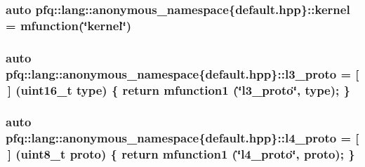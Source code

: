 \hypertarget{namespacepfq_1_1lang_1_1anonymous__namespace_02default_8hpp_03_a93294225145f96c6aa6cf0cedfa19103}{
\subsubsection[{kernel}]{\setlength{\rightskip}{0pt plus 5cm}auto pfq\+::lang\+::anonymous\+\_\+namespace\{default.\+hpp\}\+::kernel = {\bf mfunction}(\char`\"{}kernel\char`\"{})}}\label{namespacepfq_1_1lang_1_1anonymous__namespace_02default_8hpp_03_a93294225145f96c6aa6cf0cedfa19103}
\hypertarget{namespacepfq_1_1lang_1_1anonymous__namespace_02default_8hpp_03_a1515f230673119530cd04f213627976f}{
\subsubsection[{l3\+\_\+proto}]{\setlength{\rightskip}{0pt plus 5cm}auto pfq\+::lang\+::anonymous\+\_\+namespace\{default.\+hpp\}\+::l3\+\_\+proto = \mbox{[}$\,$\mbox{]} (uint16\+\_\+t type) \{ return {\bf mfunction1} (\char`\"{}l3\+\_\+proto\char`\"{}, type); \}}}\label{namespacepfq_1_1lang_1_1anonymous__namespace_02default_8hpp_03_a1515f230673119530cd04f213627976f}
\hypertarget{namespacepfq_1_1lang_1_1anonymous__namespace_02default_8hpp_03_a8ad2208c91dc3cd4378e715aab5fb4b7}{
\subsubsection[{l4\+\_\+proto}]{\setlength{\rightskip}{0pt plus 5cm}auto pfq\+::lang\+::anonymous\+\_\+namespace\{default.\+hpp\}\+::l4\+\_\+proto = \mbox{[}$\,$\mbox{]} (uint8\+\_\+t proto) \{ return {\bf mfunction1} (\char`\"{}l4\+\_\+proto\char`\"{}, proto); \}}}\label{namespacepfq_1_1lang_1_1anonymous__namespace_02default_8hpp_03_a8ad2208c91dc3cd4378e715aab5fb4b7}
